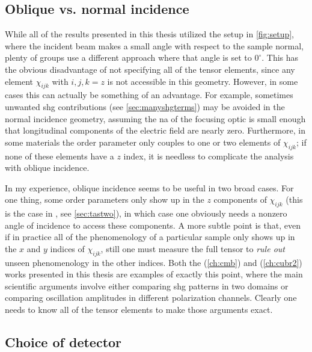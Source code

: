 \subsection{Oblique vs. normal incidence}\label{sec:obliquevsnormal}

While all of the results presented in this thesis utilized the setup in \cref{fig:setup}, where the incident beam makes a small angle with respect to the sample normal, plenty of groups use a different approach where that angle is set to $0^\circ$.
This has the obvious disadvantage of not specifying all of the tensor elements, since any element $\chi_{ijk}$ with $i, j, k = z$ is not accessible in this geometry.
However, in some cases this can actually be something of an advantage.
For example, sometimes unwanted \gls{shg} contributions (see \cref{sec:manyshgterms}) may be avoided in the normal incidence geometry, assuming the \gls{na} of the focusing optic is small enough that longitudinal components of the electric field are nearly zero.
Furthermore, in some materials the order parameter only couples to one or two elements of $\chi_{ijk}$; if none of these elements have a $z$ index, it is needless to complicate the analysis with oblique incidence.

In my experience, oblique incidence seems to be useful in two broad cases.
For one thing, some order parameters only show up in the $z$ components of $\chi_{ijk}$ (this is the case in \tastwo, see \cref{sec:tastwo}), in which case one obviously needs a nonzero angle of incidence to access these components.
A more subtle point is that, even if in practice all of the phenomenology of a particular sample only shows up in the $x$ and $y$ indices of $\chi_{ijk}$, still one must measure the full tensor to \emph{rule out} unseen phenomenology in the other indices.
Both the  (\cref{ch:cmb}) and  (\cref{ch:cubr2}) works presented in this thesis are examples of exactly this point, where the main scientific arguments involve either comparing \gls{shg} patterns in two domains or comparing oscillation amplitudes in different polarization channels.
Clearly one needs to know all of the tensor elements to make those arguments exact.

\subsection{Choice of detector}

